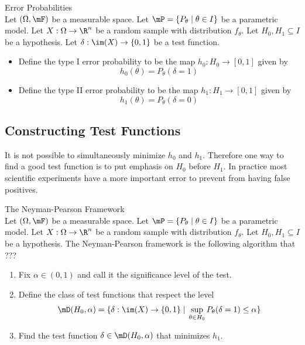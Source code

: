 \documentclass[a4paper]{article}
\begin{document}
\begin{defn}{Error Probabilities}{}\\
Let $(\Omega,\mF)$ be a measurable space. Let $\mP=\{P_\theta\;|\;\theta\in I\}$ be a parametric model. Let $X:\Omega\to\R^n$ be a random sample with distribution $f_\theta$. Let $H_0,H_1\subseteq I$ be a hypothesis. Let $\delta:\im(X)\to\{0,1\}$ be a test function. 
\begin{itemize}
\item Define the type I error probability to be the map $h_0:H_0\to[0,1]$ given by $$h_0(\theta)=P_\theta(\delta=1)$$
\item Define the type II error probability to be the map $h_1:H_1\to[0,1]$ given by $$h_1(\theta)=P_\theta(\delta=0)$$
\end{itemize}
\end{defn}

\subsection{Constructing Test Functions}
It is not possible to simultaneously minimize $h_0$ and $h_1$. Therefore one way to find a good test function is to put emphasis on $H_0$ before $H_1$. In practice most scientific experiments have a more important error to prevent from having false positives. 

\begin{defn}{The Neyman-Pearson Framework}{}\\
Let $(\Omega,\mF)$ be a measurable space. Let $\mP=\{P_\theta\;|\;\theta\in I\}$ be a parametric model. Let $X:\Omega\to\R^n$ be a random sample with distribution $f_\theta$. Let $H_0,H_1\subseteq I$ be a hypothesis. The Neyman-Pearson framework is the following algorithm that ???
\begin{enumerate}
\item Fix $\alpha\in(0,1)$ and call it the significance level of the test. 
\item Define the class of test functions that respect the level $$\mD(H_0,\alpha)=\{\delta:\im(X)\to\{0,1\}\;|\;\sup_{\theta\in H_0}P_\theta(\delta=1)\leq\alpha\}$$
\item Find the test function $\delta\in\mD(H_0,\alpha)$ that minimizes $h_1$. 
\end{enumerate}
\end{defn}
\end{document}

